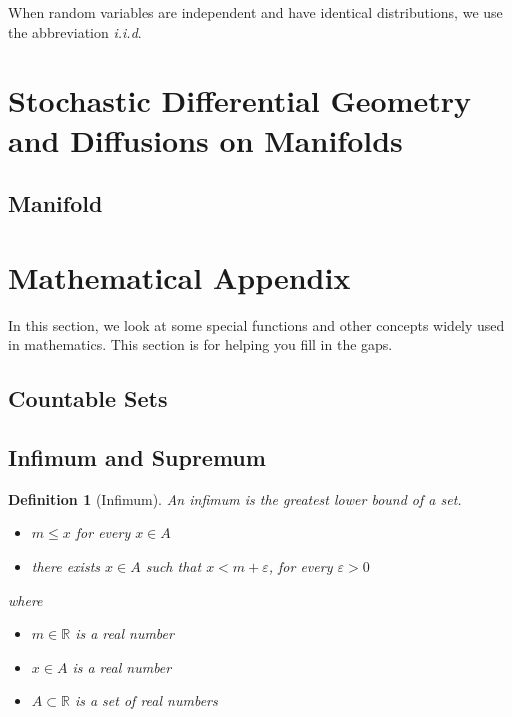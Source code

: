 \documentclass{article}
\newtheorem{definition}{Definition}
\begin{document}
When random variables are independent and have identical distributions, we use the abbreviation \emph{i.i.d}.



\newpage


\section{Stochastic Differential Geometry and Diffusions on Manifolds}

\subsection{Manifold}

 
\newpage
\section{Mathematical Appendix} \label{special_functions}
In this section, we look at some special functions and other concepts widely used in mathematics. This section is for helping you fill in the gaps.

\subsection{Countable Sets}


\subsection{Infimum and Supremum}


\begin{mdframed}
\begin{definition}[Infimum]
An \emph{infimum} is the greatest lower bound of a set.
\begin{itemize}
    \item $m \leq x$ for every $x \in A$
    \item there exists $x \in A$ such that $x < m + \varepsilon$, for every $\varepsilon > 0$
\end{itemize}

where
\begin{itemize}
    \item $m \in \mathbb{R}$ is a real number
    \item $x \in A$ is a real number
    \item $A \subset \mathbb{R}$ is a set of real numbers
\end{itemize}
\end{definition}
\end{mdframed}
\end{document}
